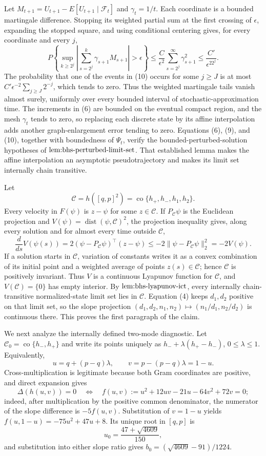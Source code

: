 Let \(M_{t+1}=U_{t+1}-E[U_{t+1}\mid\mathcal F_t]\) and \(\gamma_t=1/t\). Each coordinate is a bounded martingale difference. Stopping its weighted partial sum at the first crossing of \(\epsilon\), expanding the stopped square, and using conditional centering gives, for every coordinate and every \(j\),
\[
 P\left\{\sup_{k\geq2^j}\left|\sum_{s=2^j}^k\gamma_{s+1}M_{s+1}\right|>\epsilon\right\}
 \leq \frac{C}{\epsilon^2}\sum_{s=2^j}^{\infty}\gamma_{s+1}^2
 \leq\frac{C'}{\epsilon^22^j}. \tag{10}
\]
The probability that one of the events in (10) occurs for some \(j\geq J\) is at most \(C'\epsilon^{-2}\sum_{j\geq J}2^{-j}\), which tends to zero. Thus the weighted martingale tails vanish almost surely, uniformly over every bounded interval of stochastic-approximation time. The increments in (6) are bounded on the eventual compact region, and the mesh \(\gamma_t\) tends to zero, so replacing each discrete state by its affine interpolation adds another graph-enlargement error tending to zero. Equations (6), (9), and (10), together with boundedness of \(\Psi_t\), verify the bounded-perturbed-solution hypotheses of \(\textnormal{lem:bhs-perturbed-limit-set}\). That established lemma makes the affine interpolation an asymptotic pseudotrajectory and makes its limit set internally chain transitive.

Let
\[
 \mathcal C=h([q,p]^2)=\operatorname{co}\{h_+,h_-,h_1,h_2\}.
\]
Every velocity in \(F(\psi)\) is \(z-\psi\) for some \(z\in\mathcal C\). If \(P_{\mathcal C}\psi\) is the Euclidean projection and \(V(\psi)=\operatorname{dist}(\psi,\mathcal C)^2\), the projection inequality gives, along every solution and for almost every time outside \(\mathcal C\),
\[
 \frac{d}{ds}V(\psi(s))
 =2(\psi-P_{\mathcal C}\psi)^\top(z-\psi)
 \leq-2\|\psi-P_{\mathcal C}\psi\|_2^2=-2V(\psi). \tag{11}
\]
If a solution starts in \(\mathcal C\), variation of constants writes it as a convex combination of its initial point and a weighted average of points \(z(s)\in\mathcal C\); hence \(\mathcal C\) is positively invariant. Thus \(V\) is a continuous Lyapunov function for \(\mathcal C\), and \(V(\mathcal C)=\{0\}\) has empty interior. By \(\textnormal{lem:bhs-lyapunov-ict}\), every internally chain-transitive normalized-state limit set lies in \(\mathcal C\). Equation (4) keeps \(d_1,d_2\) positive on that limit set, so the slope projection \((d_1,d_2,n_1,n_2)\mapsto(n_1/d_1,n_2/d_2)\) is continuous there. This proves the first paragraph of the claim.

We next analyze the internally defined two-mode diagnostic. Let \(\mathcal C_0=\operatorname{co}\{h_-,h_+\}\) and write its points uniquely as \(h_-+\lambda(h_+-h_-)\), \(0\leq\lambda\leq1\). Equivalently,
\[
 u=q+(p-q)\lambda,\qquad v=p-(p-q)\lambda=1-u. \tag{12}
\]
Cross-multiplication is legitimate because both Gram coordinates are positive, and direct expansion gives
\[
 \Delta(h(u,v))=0
 \quad\Longleftrightarrow\quad
 f(u,v):=u^2+12uv-21u-64v^2+72v=0; \tag{13}
\]
indeed, after multiplication by the positive common denominator, the numerator of the slope difference is \(-5f(u,v)\). Substitution of \(v=1-u\) yields \(f(u,1-u)=-75u^2+47u+8\). Its unique root in \([q,p]\) is
\[
 u_0=\frac{47+\sqrt{4609}}{150},
\]
and substitution into either slope ratio gives \(b_0=(\sqrt{4609}-91)/1224\).

